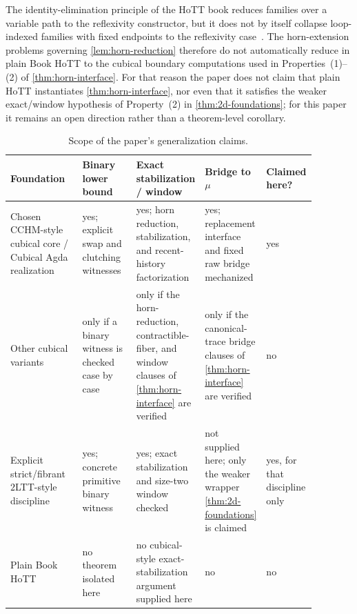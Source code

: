 \documentclass{lmcs}
\begin{document}
\begin{rem}
\label{rem:hott-scope}
The identity-elimination principle of the HoTT book reduces families over a variable path to the reflexivity constructor, but it does not by itself collapse loop-indexed families with fixed endpoints to the reflexivity case~\cite{hott}. The horn-extension problems governing \autoref{lem:horn-reduction} therefore do not automatically reduce in plain Book HoTT to the cubical boundary computations used in Properties~(1)--(2) of \autoref{thm:horn-interface}. For that reason the paper does not claim that plain HoTT instantiates \autoref{thm:horn-interface}, nor even that it satisfies the weaker exact/window hypothesis of Property~(2) in \autoref{thm:2d-foundations}; for this paper it remains an open direction rather than a theorem-level corollary.
\end{rem}

\begin{table}[t]
\centering
\caption{Scope of the paper's generalization claims.}
\label{tab:foundation-scope}
\small
\begin{tabular}{@{}p{0.24\linewidth}p{0.18\linewidth}p{0.19\linewidth}p{0.18\linewidth}p{0.09\linewidth}@{}}
\toprule
Foundation & Binary lower bound & Exact stabilization / window & Bridge to $\mu$ & Claimed here? \\
\midrule
Chosen CCHM-style cubical core / Cubical Agda realization & yes; explicit swap and clutching witnesses & yes; horn reduction, stabilization, and recent-history factorization & yes; replacement interface and fixed raw bridge mechanized & yes \\
Other cubical variants & only if a binary witness is checked case by case & only if the horn-reduction, contractible-fiber, and window clauses of \autoref{thm:horn-interface} are verified & only if the canonical-trace bridge clauses of \autoref{thm:horn-interface} are verified & no \\
Explicit strict/fibrant $2$LTT-style discipline & yes; concrete primitive binary witness & yes; exact stabilization and size-two window checked & not supplied here; only the weaker wrapper \autoref{thm:2d-foundations} is claimed & yes, for that discipline only \\
Plain Book HoTT & no theorem isolated here & no cubical-style exact-stabilization argument supplied here & no & no \\
\bottomrule
\end{tabular}
\end{table}
\end{document}

